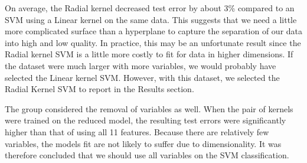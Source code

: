 \documentclass{article}
\begin{document}
On average, the Radial kernel decreased test error by about 3\% compared to an SVM using a Linear kernel on the same data. This suggests that we need a little more complicated surface than a hyperplane to capture the separation of our data into high and low quality. In practice, this may be an unfortunate result since the Radial kernel SVM is a little more costly to fit for data in higher dimensions. If the dataset were much larger with more variables, we would probably have selected the Linear kernel SVM. However, with this dataset, we selected the Radial Kernel SVM to report in the Results section. 

The group considered the removal of variables as well. When the pair of kernels were trained on the reduced model, the resulting test errors were significantly higher than that of using all 11 features. Because there are relatively few variables, the models fit are not likely to suffer due to dimensionality. It was therefore concluded that we should use all variables on the SVM classification.  
\end{document}
